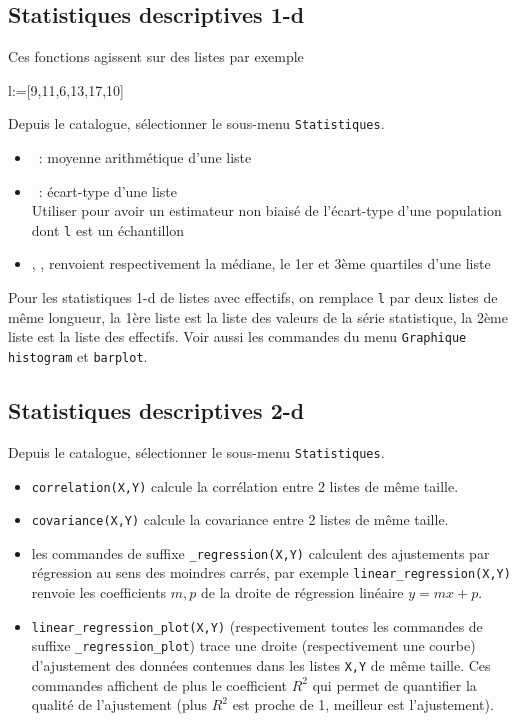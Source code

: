 \documentclass{article}
\begin{document}
\begin{giacjshere}
\subsection{Statistiques descriptives 1-d}
Ces fonctions agissent sur des listes
par exemple \begin{giaconload}l:=[9,11,6,13,17,10]\end{giaconload}
Depuis le catalogue, s\'electionner le sous-menu \verb|Statistiques|.
\begin{itemize}
\item {}~: moyenne arithm\'etique d'une liste
\item {}~: \'ecart-type d'une liste\\
Utiliser
 pour avoir un estimateur non biais\'e
de l'\'ecart-type d'une population dont \verb|l| est un \'echantillon
\item {}, , 
renvoient respectivement la m\'ediane, le 1er et 3\`eme quartiles
d'une liste
\end{itemize}
Pour les statistiques 1-d de listes avec effectifs, on remplace
\verb|l| par deux listes de m\^eme longueur, la 1\`ere liste
est la liste des valeurs de la s\'erie statistique, la 2\`eme
liste est la liste des effectifs.
Voir aussi les commandes du menu \verb|Graphique| 
\verb|histogram| et \verb|barplot|.

\subsection{Statistiques descriptives 2-d}
Depuis le catalogue, s\'electionner le sous-menu \verb|Statistiques|.
\begin{itemize}
\item \verb|correlation(X,Y)| calcule la corr\'elation entre 
2 listes de m\^eme taille.
\item \verb|covariance(X,Y)| calcule la covariance entre 
2 listes de m\^eme taille.
\item les commandes de suffixe \verb|_regression(X,Y)| calculent
des ajustements par r\'egression au sens des moindres carr\'es,
par exemple \verb|linear_regression(X,Y)| renvoie
les coefficients $m,p$ de la droite de r\'egression lin\'eaire
$y=mx+p$.\\
\item \verb|linear_regression_plot(X,Y)| (respectivement
 toutes les commandes
de suffixe \verb|_regression_plot|) trace une droite (respectivement
une courbe) d'ajustement des donn\'ees contenues dans les listes
\verb|X,Y| de m\^eme taille.
Ces commandes affichent
de plus le coefficient $R^2$ qui permet de quantifier la qualit\'e
de l'ajustement (plus $R^2$ est proche de 1, meilleur est
l'ajustement).
\end{itemize}


\end{giacjshere}
\end{document}
